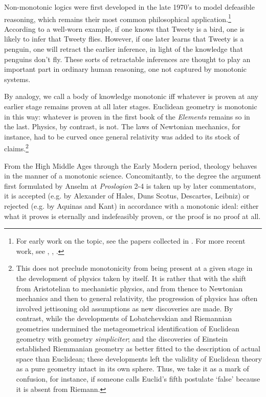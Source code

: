 \documentclass[]{birkjour}
\begin{document}
Non-monotonic logics were first developed in the late 1970's to model defeasible reasoning, which remains their most common philosophical application.\footnote{For early work on the topic, see the papers collected in \cite{Ginsberg1987}. For more recent work, see \cite{Gabbay1994}, \cite{Makinson2005}, \cite{SchurzLeitgeb2005}.} According to a well-worn example, if one knows that Tweety is a bird, one is likely to infer that Tweety flies. However, if one later learns that Tweety is a penguin, one will retract the earlier inference, in light of the knowledge that penguins don't fly. These sorts of retractable inferences are thought to play an important part in ordinary human reasoning, one not captured by monotonic systems.
		
By analogy, we call a body of knowledge monotonic iff whatever is proven at any earlier stage remains proven at all later stages. Euclidean geometry is monotonic in this way: whatever is proven in the first book of the \textit{Elements} remains so in the last. Physics, by contrast, is not. The laws of Newtonian mechanics, for instance, had to be curved once general relativity was added to its stock of claims.\footnote{This does not preclude monotonicity from being present at a given stage in the development of physics taken by itself. It is rather that with the shift from Aristotelian to mechanistic physics, and from thence to Newtonian mechanics and then to general relativity, the progression of physics has often involved jettisoning old assumptions as new discoveries are made. By contrast, while the developments of Lobatchevskian and Riemannian geometries undermined the metageometrical identification of Euclidean geometry with geometry \textit{simpliciter}; and the discoveries of Einstein established Riemmanian geometry as better fitted to the description of actual space than Euclidean; these developments left the validity of Euclidean theory as a pure geometry intact in its own sphere. Thus, we take it as a mark of confusion, for instance, if someone calls Euclid's fifth postulate `false' because it is absent from Riemann.} 
	
From the High Middle Ages through the Early Modern period, theology behaves in the manner of a monotonic science. Concomitantly, to the degree the argument first formulated by Anselm at \textit{Proslogion} 2-4 is taken up by later commentators, it is accepted (e.g. by Alexander of Hales, Duns Scotus, Descartes, Leibniz) or rejected (e.g. by Aquinas and Kant) in accordance with a monotonic ideal: either what it proves is eternally and indefeasibly proven, or the proof is no proof at all.
	
\end{document}
